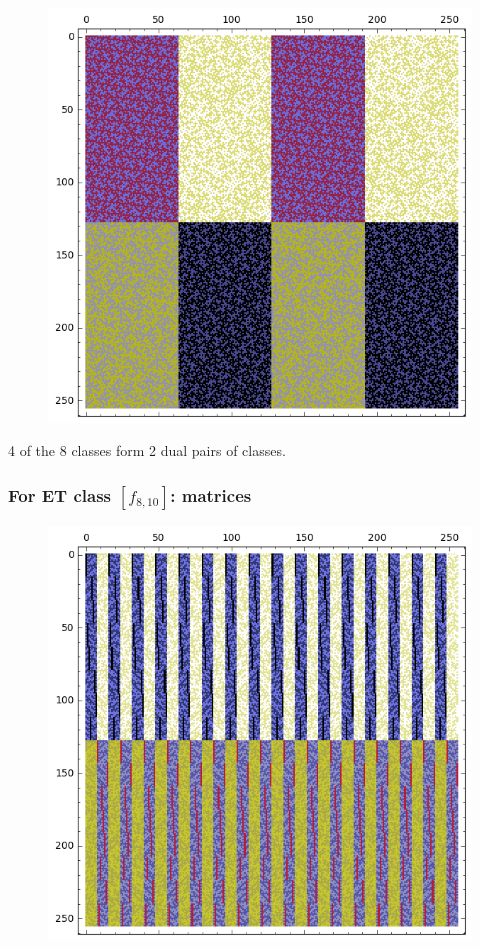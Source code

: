 \documentclass[pdf,sprung,slideColor,nocolorBG]{beamer}
\newenvironment{colortheme}[1]{
\def\ProvidesPackageRCS $##1${\relax}
\renewcommand{\ProcessOptions}{\relax}
\makeatletter

\makeatother
}{}
\begin{document}
\begin{colortheme}{jubata}
\begin{frame}
\begin{figure}
\begin{minipage}{.48\textwidth}
  \centering
  \includegraphics[width=.9\linewidth]{../matrix_plot/re8_9_dual_cayley_graph_index_matrix.png}
  \label{fig:c8_9_dual_cayley_graph_index_matrix}
\end{minipage}%
\end{figure}
4 of the 8 classes form 2 dual pairs of classes.
\end{frame}
\begin{frame}
\frametitle{For ET class $[f_{8,10}]$: matrices}
\begin{figure}
\centering
\begin{minipage}{.48\textwidth}
  \centering
  \includegraphics[width=.9\linewidth]{../matrix_plot/re8_10_bent_cayley_graph_index_matrix.png}

\end{minipage}
\end{figure}
\end{frame}
\end{colortheme}
\end{document}
